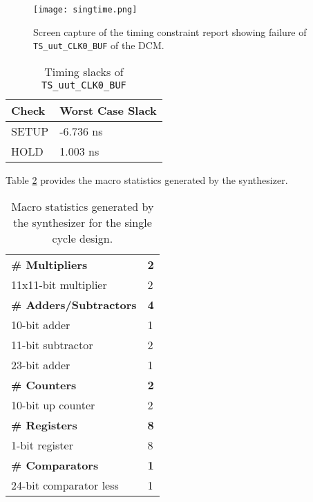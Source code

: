 \documentclass[paper=usletter, fontsize=12pt]{article}
\begin{document}
        \begin{figure}[ht]
            \begin{center}
                \texttt{[image: singtime.png]}
                \caption{Screen capture of the timing constraint report showing
                failure of \texttt{TS\_uut\_CLK0\_BUF} of the DCM.}
                \label{fig:singtime}
            \end{center}
        \end{figure}

        \begin{table}[h]
            \caption{Timing slacks of \texttt{TS\_uut\_CLK0\_BUF}}
            \label{table:singslacks}
            \centering
            \begin{tabular}{ m{5em}m{10em} }
                \hline
                \textbf{Check}  &   \textbf{Worst Case Slack} \\
                \hline
                SETUP           &   -6.736 ns \\
                HOLD            &   1.003 ns \\
                \hline
            \end{tabular}
        \end{table}

        Table \ref{table:singlemacro} provides the macro statistics generated
        by the synthesizer.

        \begin{table}[h]
            \caption{Macro statistics generated by the synthesizer for the
            single cycle design.}
            \label{table:singlemacro}
            \centering

            \begin{tabular*}{250pt}{ m{20em}m{1cm} }
                \textbf{\# Multipliers}         & \textbf{2} \\
                 11x11-bit multiplier           & 2 \\
                \textbf{\# Adders/Subtractors}  & \textbf{4} \\
                 10-bit adder                   & 1 \\
                 11-bit subtractor              & 2 \\
                 23-bit adder                   & 1 \\
                \textbf{\# Counters}            & \textbf{2} \\
                 10-bit up counter              & 2 \\
                \textbf{\# Registers}           & \textbf{8} \\
                 1-bit register                 & 8 \\
                \textbf{\# Comparators}         & \textbf{1} \\
                 24-bit comparator less         & 1 \\
            \end{tabular*}

        \end{table}
\end{document}
